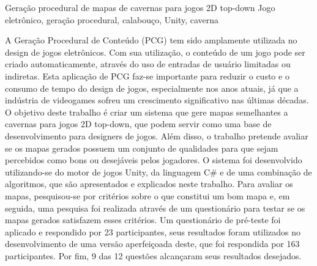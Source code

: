 \begin{englishabstract}
{Geração procedural de mapas de cavernas para jogos 2D top-down}
{Jogo eletrônico, geração procedural, calabouço, Unity, caverna}

A Geração Procedural de Conteúdo (PCG) tem sido amplamente utilizada no design de jogos eletrônicos. Com sua utilização, o conteúdo de um jogo pode ser criado automaticamente, através do uso de entradas de usuário limitadas ou indiretas. Esta aplicação de PCG faz-se importante para reduzir o custo e o consumo de tempo do design de jogos, especialmente nos anos atuais, já que a indústria de videogames sofreu um crescimento significativo nas últimas décadas. O objetivo deste trabalho é criar um sistema que gere mapas semelhantes a cavernas para jogos 2D top-down, que podem servir como uma base de desenvolvimento para designers de jogos. Além disso, o trabalho pretende avaliar se os mapas gerados possuem um conjunto de qualidades para que sejam percebidos como bons ou desejáveis pelos jogadores. O sistema foi desenvolvido utilizando-se do motor de jogos Unity, da linguagem C\# e de uma combinação de algoritmos, que são apresentados e explicados neste trabalho. Para avaliar os mapas, pesquisou-se por critérios sobre o que constitui um bom mapa e, em seguida, uma pesquisa foi realizada através de um questionário para testar se os mapas gerados satisfazem esses critérios. Um questionário de pré-teste foi aplicado e respondido por 23 participantes, seus resultados foram utilizados no desenvolvimento de uma versão aperfeiçoada deste, que foi respondida por 163 participantes. Por fim, 9 das 12 questões alcançaram seus resultados desejados.

\end{englishabstract}



